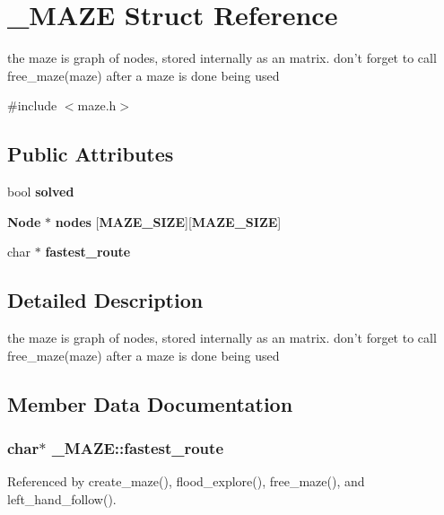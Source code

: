 \section{\-\_\-\-M\-A\-Z\-E Struct Reference}
\label{struct__MAZE}


the maze is graph of nodes, stored internally as an matrix. don't forget to call free\-\_\-maze(maze) after a maze is done being used  




{\ttfamily \#include $<$maze.\-h$>$}

\subsection*{Public Attributes}
\begin{DoxyCompactItemize}
\item 
bool {\bf solved}
\item 
{\bf Node} $\ast$ {\bf nodes} [{\bf M\-A\-Z\-E\-\_\-\-S\-I\-Z\-E}][{\bf M\-A\-Z\-E\-\_\-\-S\-I\-Z\-E}]
\item 
char $\ast$ {\bf fastest\-\_\-route}
\end{DoxyCompactItemize}


\subsection{Detailed Description}
the maze is graph of nodes, stored internally as an matrix. don't forget to call free\-\_\-maze(maze) after a maze is done being used 

\subsection{Member Data Documentation}
\subsubsection[{fastest\-\_\-route}]{\setlength{\rightskip}{0pt plus 5cm}char$\ast$ \-\_\-\-M\-A\-Z\-E\-::fastest\-\_\-route}\label{struct__MAZE_a7b9247d555d606e8588851f62f6c7de8}


Referenced by create\-\_\-maze(), flood\-\_\-explore(), free\-\_\-maze(), and left\-\_\-hand\-\_\-follow().

